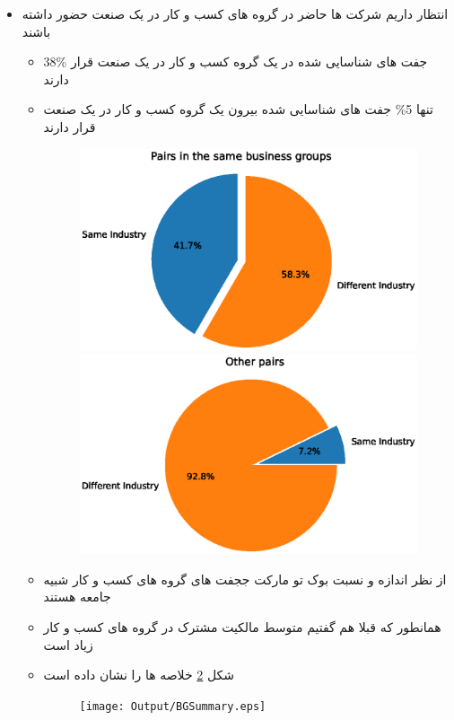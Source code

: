 \begin{appendices}
	\begin{itemize}
		\item 
		انتظار داریم شرکت ها حاضر در گروه های کسب و کار در یک صنعت حضور داشته باشند
		\begin{itemize}
			\item 
			38\% جفت های شناسایی شده در یک گروه کسب و کار در یک صنعت قرار دارند 
			\item 
			تنها 5\% جفت های شناسایی شده بیرون یک گروه کسب و کار در یک صنعت قرار دارند 
			\begin{figure}[htbp]
				\caption{}
				\label{sameIndustryinBG}
				\centering
				\includegraphics[width=0.48\linewidth]{Output/sameIndustryinBG.eps}
				\includegraphics[width=0.48\linewidth]{Output/sameIndustryNoinBG.eps}
			\end{figure}
			\item 
			از نظر اندازه و نسبت بوک تو مارکت ججفت های گروه های کسب و کار شبیه جامعه هستند
			\item 
			همانطور که قبلا هم گفتیم متوسط مالکیت مشترک در گروه های کسب و کار زیاد است
			\item 
			شکل 
			\ref{BGSummary}
			خلاصه ها را نشان داده است
			\begin{figure}[htbp]
				\caption{}
				\label{BGSummary}
				\centering
				\texttt{[image: Output/BGSummary.eps]}
			\end{figure}
		\end{itemize}
		
		
	\end{itemize}
	
	
	\FloatBarrier
	
	
	
	
	
\end{appendices}
